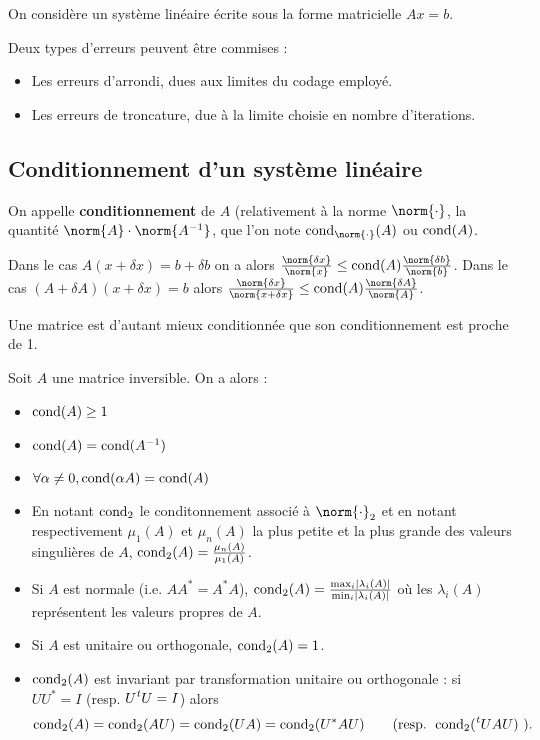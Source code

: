 On considère un système linéaire écrite sous la forme matricielle $Ax = b$.

Deux types d'erreurs peuvent être commises :
\begin{itemize}
\item[\textbullet] Les erreurs d'arrondi, dues aux limites du codage employé.
\item[\textbullet] Les erreurs de troncature, due à la limite choisie en nombre d'iterations.
\end{itemize}

\subsection{Conditionnement d'un système linéaire}

	\begin{defn}
		On appelle \textbf{conditionnement} de $A$ (relativement à la norme $\norm{\cdot}$, la quantité $\norm{A} \cdot \norm{A^{-1}}$, que l'on note $\cond_{\norm{\cdot}}(A)$ ou $\operatorname{cond}(A)$.
	\end{defn}

	Dans le cas $A(x + \delta x) = b + \delta b$ on a alors $\frac{\norm{\delta x}}{\norm{x}} \leq \cond(A) \frac{\norm{\delta b}}{\norm{b}}$.
	Dans le cas $(A + \delta A)(x + \delta x) = b$ alors $\frac{\norm{\delta x}}{\norm{x + \delta x}} \leq \cond(A) \frac{\norm{\delta A}}{\norm{A}}$.

	Une matrice est d'autant mieux conditionnée que son conditionnement est proche de 1.

	\begin{thm}
		Soit $A$ une matrice inversible. On a alors :
		\begin{itemize}
		\item[\textbullet] $\operatorname{cond}(A) \geq 1$
		\item[\textbullet] $\operatorname{cond}(A) = \operatorname{cond}(A^{-1})$
		\item[\textbullet] $\forall \alpha \neq 0, \operatorname{cond}(\alpha A) = \operatorname{cond}(A)$
		\item[\textbullet] En notant $\operatorname{cond}_2$ le conditonnement associé à $\norm{\cdot}_2$ et en notant respectivement $\mu_1(A)$ et $\mu_n(A)$ la plus petite et la plus grande des valeurs singulières de $A$, $\operatorname{cond}_2(A) = \frac{\mu_n(A)}{\mu_1(A)}$.
		\item[\textbullet] Si $A$ est normale (i.e. $A A^* = A^* A$), $\operatorname{cond}_2(A) = \frac{\max_i \left\lvert\lambda_i(A)\right\rvert}{\min_i \left\lvert\lambda_i(A)\right\rvert}$ où les $\lambda_i(A)$ représentent les valeurs propres de $A$.
		\item[\textbullet] Si $A$ est unitaire ou orthogonale, $\operatorname{cond}_2(A) = 1$.
		\item[\textbullet]
			$\operatorname{cond}_2(A)$ est invariant par transformation unitaire ou orthogonale : si $U U^* = I$ (resp. $U \transp{U} = I$) alors
			$$\cond_2(A) = \cond_2(AU) = \cond_2(UA) = \cond_2(U^* A U) \qquad \text{(resp. } \cond_2(\transp{U}AU) \text{ )}.$$
		\end{itemize}
	\end{thm}

